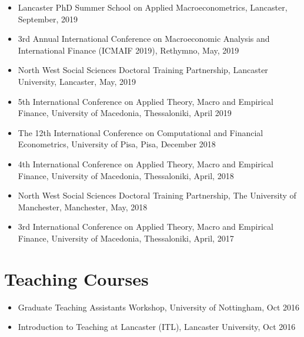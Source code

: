\documentclass[10pt,]{article}
\providecommand{\tightlist}{%
        \setlength{\itemsep}{0pt}\setlength{\parskip}{0pt}}
\begin{document}
              \begin{itemize}
              \tightlist
              \item
                Lancaster PhD Summer School on Applied
                Macroeconometrics, Lancaster, September, 2019
              \item
                3rd Annual International Conference on Macroeconomic
                Analysis and International Finance (ICMAIF 2019),
                Rethymno, May, 2019
              \item
                North West Social Sciences Doctoral Training
                Partnership, Lancaster University, Lancaster, May, 2019
              \item
                5th International Conference on Applied Theory, Macro
                and Empirical Finance, University of Macedonia,
                Thessaloniki, April 2019
              \item
                The 12th International Conference on Computational and
                Financial Econometrics, University of Pisa, Pisa,
                December 2018
              \item
                4th International Conference on Applied Theory, Macro
                and Empirical Finance, University of Macedonia,
                Thessaloniki, April, 2018
              \item
                North West Social Sciences Doctoral Training
                Partnership, The University of Manchester, Manchester,
                May, 2018
              \item
                3rd International Conference on Applied Theory, Macro
                and Empirical Finance, University of Macedonia,
                Thessaloniki, April, 2017
              \end{itemize}

              \hypertarget{teaching-courses}{%
              \section{Teaching Courses}\label{teaching-courses}}

              \begin{itemize}
              \item
                Graduate Teaching Assistants Workshop, University of
                Nottingham, Oct 2016
              \item
                Introduction to Teaching at Lancaster (ITL), Lancaster
                University, Oct 2016
              \end{itemize}
\end{document}
